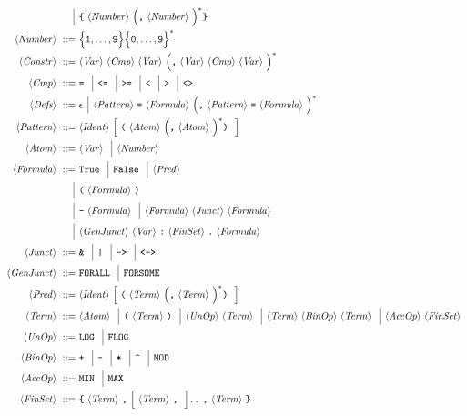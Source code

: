 \documentclass[twoside]{article}
\begin{document}
\begin{align*}
                \altn & \term{\{} \nonterm{Number} \group{\term{,} \nonterm{Number}}^* \term{\}} \\
\nonterm{Number} ::=\ & \enumset{\texttt{1},\ldots,\texttt{9}}\enumset{\texttt{0},\ldots,\texttt{9}}^* \\ 
\nonterm{Constr} ::=\ & \nonterm{Var} \nonterm{Cmp} \nonterm{Var} \group{\term{,} \nonterm{Var} \nonterm{Cmp} \nonterm{Var}}^* \\
\nonterm{Cmp} ::=\ & \term{=} \altn \term{<=} \altn \term{>=} \altn \term{<} \altn \term{>} \altn \term{<>} \\ 
\nonterm{Defs} ::=\ & \epsilon \altn \nonterm{Pattern} \term{=} \nonterm{Formula} \group{\term{,} \nonterm{Pattern} \term{=} \nonterm{Formula}}^* \\
\nonterm{Pattern} ::=\ &\nonterm{Ident} \optional{\term{(} \nonterm{Atom} \group{\term{,} \nonterm{Atom}}^* \term{)}} \\
\nonterm{Atom} ::=\ &\nonterm{Var} \altn \nonterm{Number} \\
\nonterm{Formula} ::=\ & \term{True} \altn \term{False} \altn \nonterm{Pred} \\
                 \altn & \term{(} \nonterm{Formula} \term{)} \\
                 \altn & \term{-} \nonterm{Formula} \altn \nonterm{Formula} \nonterm{Junct} \nonterm{Formula} \\
                 \altn & \nonterm{GenJunct} \nonterm{Var} \term{:} \nonterm{FinSet} \term{.} \nonterm{Formula} \\
\nonterm{Junct} ::=\ & \term{\&} \altn \term{|} \altn \term{->} \altn \term{<->} \\
\nonterm{GenJunct} ::=\ & \term{FORALL} \altn \term{FORSOME} \\
\nonterm{Pred} ::=\ & \nonterm{Ident} \optional{\term{(} \nonterm{Term} \group{\term{,} \nonterm{Term}}^* \term{)}} \\
\nonterm{Term} ::=\ & \nonterm{Atom} \altn \term{(} \nonterm{Term} \term{)} \altn \nonterm{UnOp} \nonterm{Term} \altn \nonterm{Term} \nonterm{BinOp} \nonterm{Term} \altn \nonterm{AccOp} \nonterm{FinSet} \\
\nonterm{UnOp} ::=\ & \term{LOG} \altn \term{FLOG} \\
\nonterm{BinOp} ::=\ &\term{+} \altn \term{-} \altn \term{*} \altn \term{\textasciicircum} \altn \term{MOD} \\
\nonterm{AccOp} ::=\ &\term{MIN} \altn \term{MAX} \\
\nonterm{FinSet} ::=\ & \term{\{} \nonterm{Term} \term{,} \optional{\nonterm{Term} \term{,}} \term{..} \term{,} \nonterm{Term} \term{\}} \\

\end{align*}
\end{document}
